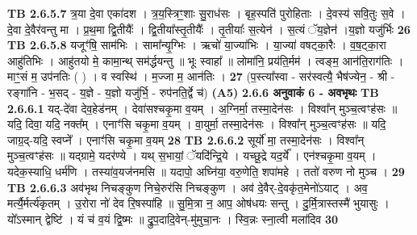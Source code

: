 \documentclass[17pt]{extarticle}
\begin{document}
                  \newline
                                \textbf{ TB 2.6.5.7} \newline
                  त्र॒या दे॒वा एका॑दश । त्र॒य॒स्त्रिꣳ॒॒शाः सु॒राध॑सः । बृह॒स्पति॑ पुरोहिताः । दे॒वस्य॑ सवि॒तुः स॒वे । दे॒वा दे॒वैर॑वन्तु मा । प्र॒थ॒मा द्वि॒तीयैः᳚ । द्वि॒तीया᳚स्तृ॒तीयैः᳚ । तृ॒तीयाः᳚ स॒त्येन॑ । स॒त्यं ॅय॒ज्ञेन॑ ।य॒ज्ञो यजु॑र्भिः \textbf{ 26} \newline
                  \newline
                                \textbf{ TB 2.6.5.8} \newline
                  यजूꣳ॑षि॒ साम॑भिः । सामा᳚न्यृ॒ग्भिः । ऋचो॑ या॒ज्या॑भिः । या॒ज्या॑ वषट्का॒रैः । व॒ष॒ट्का॒रा आहु॑तिभिः । आहु॑तयो मे॒ कामा॒न्थ् सम॑र्द्धयन्तु ॥ भूः स्वाहा᳚ ॥ लोमा॑नि॒ प्रय॑ति॒र्मम॑ । त्वङ्म॒ आन॑ति॒राग॑तिः । माꣳ॒॒सं म॒ उप॑नतिः ( ) । व स्वस्थि॑ । म॒ज्जा म॒ आन॑तिः । \textbf{ 27} \newline
                  \newline
                                    (प॒स्त्या᳚स्वा - सर॑स्वत्यै॒ भैष॑ज्येन॒ - श्री - रङ्गा॑नि - भ॒सद् - य॒ज्ञे - य॒ज्ञो यजु॑र्भि॒ - रुप॑नति॒र्द्वे च॑) \textbf{(A5)} \newline \newline
                \textbf{ 2.6.6     अनुवाकं   6 - अवभृथः} \newline
                                \textbf{ TB 2.6.6.1} \newline
                  यद्-दे॑वा देव॒हेड॑नम् । देवा॑सश्चकृ॒मा व॒यम् । अ॒ग्निर्मा॒ तस्मा॒देन॑सः । विश्वा᳚न् मुञ्च॒त्वꣳह॑सः ॥ यदि॒ दिवा॒ यदि॒ नक्त᳚म् । एनाꣳ॑सि चकृ॒मा व॒यम् । वा॒युर्मा॒ तस्मा॒देन॑सः । विश्वा᳚न् मुञ्च॒त्वꣳह॑सः ॥ यदि॒ जाग्र॒द्-यदि॒ स्वप्ने᳚ । एनाꣳ॑सि चकृ॒मा व॒यम् \textbf{ 28} \newline
                  \newline
                                \textbf{ TB 2.6.6.2} \newline
                  सूर्यो॑ मा॒ तस्मा॒देन॑सः । विश्वा᳚न् मुञ्च॒त्वꣳह॑सः ॥ यद्ग्रामे॒ यदर॑ण्ये । यथ् स॒भायां॒ ॅयदि॑न्द्रि॒ये । यच्छू॒द्रे यद॒र्ये᳚ । एन॑श्चकृ॒मा व॒यम् । यदेक॒स्याधि॒ धर्म॑णि । तस्या॑व॒यज॑नमसि ॥ यदापो॒ अघ्नि॑या॒ वरु॒णेति॒ शपा॑महे । ततो॑ वरुण नो मुञ्च । \textbf{ 29} \newline
                  \newline
                                \textbf{ TB 2.6.6.3} \newline
                  अव॑भृथ निचङ्कुण निचे॒रुर॑सि निचङ्कुण । अव॑ दे॒वैर्-दे॒वकृ॑त॒मेनो॑ऽयाट् । अव॒ मर्त्यै॒र्मर्त्य॑कृतम् । उ॒रोरा नो॑ देव रि॒षस्पा॑हि ॥ सु॒मि॒त्रा न॒ आप॒ ओष॑धयः सन्तु । दु॒र्मि॒त्रास्तस्मै॑ भुयासुः । यो᳚ऽस्मान् द्वेष्टि॑ । यं च॑ व॒यं द्वि॒ष्मः ॥ द्रु॒प॒दादि॒वेन्-मु॑मुचा॒नः । स्वि॒न्नः स्ना॒त्वी मला॑दिव \textbf{ 30} \newline
\end{document}
